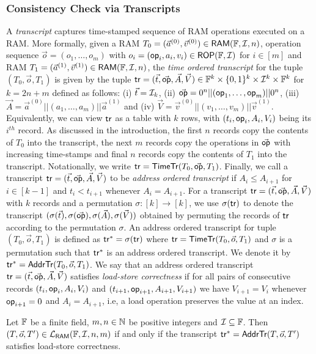 \subsubsection{Consistency Check via Transcripts}\label{subsec:transcripts}
A {\em transcript} captures time-stamped sequence of RAM operations executed on a RAM. More formally, given a RAM $T_0=(\vec{a}^{(0)},\vec{v}^{(0)})\in \mathsf{RAM}(\mathbb{F}, \mathcal{I}, {n})$,
operation sequence $\vec{o}=(o_1,\ldots,o_m)$ with $o_i=(\mathsf{op}_i,a_i,v_i)\in \mathsf{ROP}(\mathbb{F}, \mathcal{I})$ for $i\in [m]$ and RAM $T_1=(\vec{a}^{(1)}, \vec{v}^{(1)})\in \mathsf{RAM}(\mathbb{F}, \mathcal{I}, {n})$,
the {\em time ordered transcript} for the tuple $(T_0,\vec{o},T_1)$ is given by the tuple $\mathsf{tr} = (\vec{t},\vec{\mathsf{op}},\vec{A},\vec{V})\in \mathbb{F}^k\times \{0,1\}^k\times
\mathcal{I}^k\times \mathbb{F}^k$ for $k=2n+m$ defined as follows: (i) $\vec{t}=\mathcal{I}_{k}$, (ii) $\vec{\mathsf{op}}=0^n||(\mathsf{op}_1,\ldots,\mathsf{op}_m)||0^n$,
(iii) $\vec{A}=\vec{a}^{(0)}||(a_1,\ldots,a_m)||\vec{a}^{(1)}$ and (iv) $\vec{V}=\vec{v}^{(0)}||(v_1,\ldots,v_m)||\vec{v}^{(1)}$. Equivalently, we can
view $\mathsf{tr}$ as a table with $k$ rows, with $(t_i,\mathsf{op}_i,A_i,V_i)$ being its $i^{th}$ record. As discussed in the introduction, the first $n$ records
copy the contents of $T_0$ into the transcript, the next $m$ records copy the operations in $\vec{\mathsf{op}}$ with increasing time-stamps and final $n$
records copy the contents of $T_1$ into the transcript. Notationally, we write $\mathsf{tr}=\mathsf{TimeTr}(T_0,\vec{\mathsf{op}},T_1)$.
Finally, we call a transcript $\mathsf{tr}=(\vec{t},\vec{\mathsf{op}},\vec{A},\vec{V})$ to be {\em address ordered transcript} if $A_i\leq A_{i+1}$ for $i\in [k-1]$ and
$t_i < t_{i+1}$ whenever $A_i=A_{i+1}$. For a transcript $\mathsf{tr}=(\vec{t},\vec{\mathsf{op}},\vec{A},\vec{V})$ with $k$ records and a
permutation $\sigma:[k]\rightarrow [k]$, we use $\sigma(\mathsf{tr})$ to denote the transcript $(\sigma(\vec{t}),\sigma(\vec{\mathsf{op}}),\sigma(\vec{A}),\sigma(\vec{V}))$
obtained by permuting the records of $\mathsf{tr}$ according to the permutation $\sigma$. An
address ordered transcript for tuple $(T_0,\vec{o},T_1)$ is defined as $\mathsf{tr}^\ast=\sigma(\mathsf{tr})$ where $\mathsf{tr}=\mathsf{TimeTr}(T_0,\vec{o},T_1)$ and $\sigma$ is
a permutation such that $\mathsf{tr}^\ast$ is an address ordered transcript. We denote it by $\mathsf{tr}^\ast=\mathsf{AddrTr}(T_0,\vec{o},T_1)$.
We say that an address ordered transcript $\mathsf{tr}=(\vec{t},\vec{\mathsf{op}},\vec{A},\vec{V})$ satisfies {\em load-store correctness}
if for all pairs of consecutive records $(t_i,\mathsf{op}_i,A_i,V_i)$ and $(t_{i+1},\mathsf{op}_{i+1},A_{i+1},V_{i+1})$ we have $V_{i+1}=V_i$ whenever $\mathsf{op}_{i+1}=0$ and
$A_i=A_{i+1}$, i.e, a load operation preserves the value at an index.

\begin{lemma}\label{lem:consistency-check}
Let $\mathbb{F}$ be a finite field, $m,n\in \mathbb{N}$ be positive integers and $\mathcal{I}\subseteq \mathbb{F}$. Then $(T,\vec{o},T')\in \mathcal{L}_{\mathsf{RAM}}(\mathbb{F},\mathcal{I},n,m)$ if and only if
    the transcript $\mathsf{tr}^\ast=\mathsf{AddrTr}(T,\vec{o},T')$ satisfies load-store correctness.
\end{lemma}

